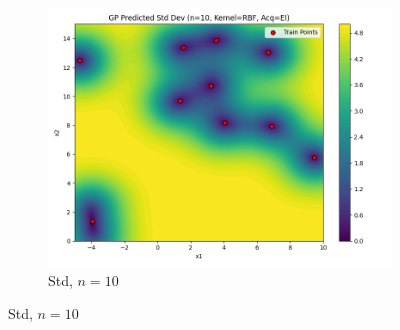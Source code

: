 \documentclass[a4paper,12pt]{article}
\begin{document}
\begin{figure}[H]
\begin{subfigure}{0.3\textwidth}
    \includegraphics[width=\linewidth]{Task-02/images/gp_std_rbf_n10_EI.png}
    \caption{Std, $n=10$}
\end{subfigure}


\end{figure}
\end{document}
